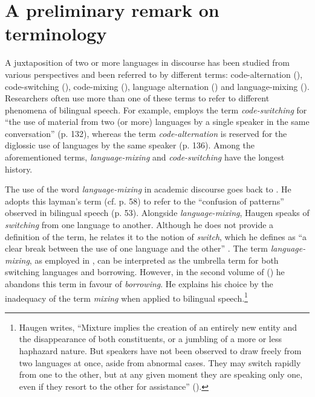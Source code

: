 \section{A preliminary remark on terminology}
\label{sec:preliminary}
A juxtaposition of two or more languages in discourse has been studied from various perspectives and been referred to by different terms: code-alternation (\citealt{ extra-code-copying-1993,johanson-zum-1999, thomason-language-2001,migge-exploring-2013}), code-switching (\citealt{gumperz-social-1972, poplack-sometimes-1980,myers-scotton-duelling-1993,backus-two-1996}), code-mixing (\citealt{muysken-bilingual-2000,muhamedowa-untersuchung-2006}), language alternation (\citealt{auer-bilingual-1984, maschler-transition-1998}) and language-mixing (\citealt{pfaff-1979, backus-patterns-1992,lanza-language-2004}). Researchers often use more than one of these terms to refer to different phenomena of bilingual speech. For example, \citet{thomason-language-2001} employs the term \textit{code-switching}  for ``the use of material from two (or more) languages by a single speaker in the same conversation'' (p. 132), whereas the term \textit{code-alternation} is reserved for the diglossic use of languages by the same speaker (p. 136). Among the aforementioned terms, \textit {language-mixing} and \textit {code-switching} have the longest history. 

The use of the word \textit {language-mixing} in academic discourse goes back to \citet{haugen-1953-vol1}. He adopts this layman's term (cf. p. 58) to refer to the ``confusion of patterns'' observed in bilingual speech (p. 53). Alongside \textit{language-mixing}, Haugen speaks of \textit{switching} from one language to another. Although he does not provide a definition of the term, he relates it to the notion of \textit{switch}, which he defines as ``a clear break between the use of one language and the other'' \citep[65]{haugen-1953-vol1}. The term \textit{language-mixing}, as employed in \citet{haugen-1953-vol1}, can be interpreted as the umbrella term for both switching languages and borrowing. However, in the second volume of  (\citeyear{haugen-1953-vol2}) he abandons this term in favour of \textit{borrowing}. He explains his choice by the inadequacy of the term \textit{mixing} when applied to bilingual speech.\footnote{
Haugen writes, ``Mixture implies the creation of an entirely new entity and the disappearance of both constituents, or a jumbling of a more or less haphazard nature. But speakers have not been observed to draw freely from two languages at once, aside from abnormal cases. They may switch rapidly from one to the other, but at any given moment they are speaking only one, even if they resort to the other for assistance'' (\citeyear[362]{haugen-1953-vol2}).}

